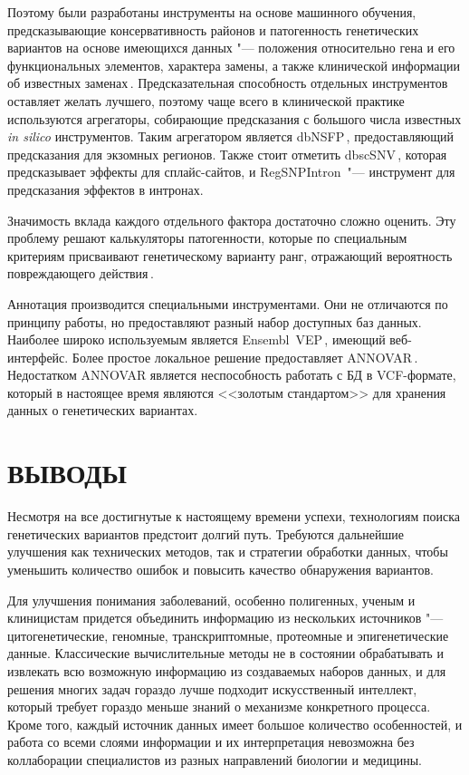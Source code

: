 \documentclass[12pt, twoside, a4paper]{article}
\newcommand{\utilname}[1]{\textenglish{#1}}
\begin{document}
\begin{enumerate}
	      Поэтому были разработаны инструменты на основе машинного обучения, предсказывающие консервативность районов и патогенность генетических вариантов на основе имеющихся данных "--- положения относительно гена и его функциональных элементов, характера замены, а также клинической информации об известных заменах\,\cite{j_Brea_Fernandez_2011}.
	      Предсказательная способность отдельных инструментов оставляет желать лучшего, поэтому чаще всего в клинической практике используются агрегаторы, собирающие предсказания с большого числа известных \textit{in silico} инструментов.
	      Таким агрегатором является dbNSFP\,\citep{Liu_2016}, предоставляющий предсказания для экзомных регионов.
	      Также стоит отметить dbscSNV\,\citep{Jian_2013}, которая предсказывает эффекты для сплайс-сайтов, и RegSNPIntron\,\citep{Lin_2019} "--- инструмент для предсказания эффектов в интронах.
	      
	      
\end{enumerate}

Значимость вклада каждого отдельного фактора достаточно сложно оценить.
Эту проблему решают калькуляторы патогенности, которые по специальным критериям присваивают генетическому варианту ранг, отражающий вероятность повреждающего действия\,\cite{Ryzhkova_2017}.

Аннотация производится специальными инструментами.
Они не отличаются по принципу работы, но предоставляют разный набор доступных баз данных.
Наиболее широко используемым является \utilname{Ensembl~VEP}\,\citep{McLaren_2016}, имеющий веб-интерфейс.
Более простое локальное решение предоставляет \utilname{ANNOVAR}\,\citep{Wang_2010}.
Недостатком ANNOVAR является неспособность работать с БД в VCF-формате, который в настоящее время являются <<золотым стандартом>> для хранения данных о генетических вариантах.

\section*{ВЫВОДЫ}

Несмотря на все достигнутые к настоящему времени успехи, технологиям поиска генетических вариантов предстоит долгий путь.
Требуются дальнейшие улучшения как технических методов, так и стратегии обработки данных, чтобы уменьшить количество ошибок и повысить качество обнаружения вариантов.

Для улучшения понимания заболеваний, особенно полигенных, ученым и клиницистам придется объединить информацию из нескольких источников "--- цитогенетические, геномные, транскриптомные, протеомные и эпигенетические данные.
Классические вычислительные методы не в состоянии обрабатывать и извлекать всю возможную информацию из создаваемых наборов данных, и для решения многих задач гораздо лучше подходит искусственный интеллект, который требует гораздо меньше знаний о механизме конкретного процесса.
Кроме того, каждый источник данных имеет большое количество особенностей, и работа со всеми слоями информации и их интерпретация невозможна без коллаборации специалистов из разных направлений биологии и медицины.
\end{document}
